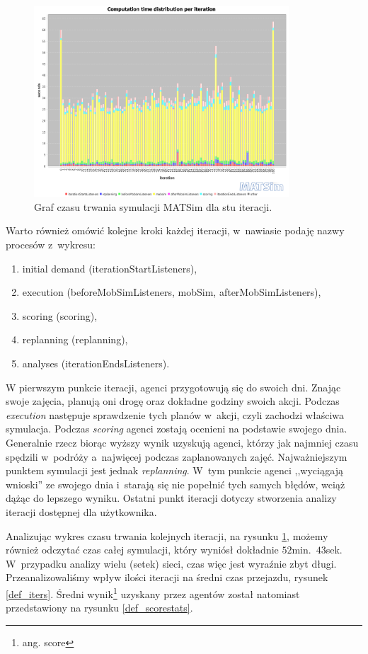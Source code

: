 \documentclass[twoside,12pt]{report}
\begin{document}
\begin{figure}[ht]
\centering
\includegraphics[width=0.85\textwidth]{img/def_stopwatch}
\caption{Graf czasu trwania symulacji MATSim dla stu iteracji.}
\label{def_stopwatch}
\end{figure}

Warto również omówić kolejne kroki każdej iteracji, w~nawiasie podaję nazwy procesów z~wykresu:
\begin{enumerate}
\item initial demand (iterationStartListeners),
\item execution (beforeMobSimListeners, mobSim, afterMobSimListeners), 
\item scoring (scoring),
\item replanning (replanning),
\item analyses (iterationEndsListeners).
\end{enumerate}

W pierwszym punkcie iteracji, agenci przygotowują się do swoich dni. Znając swoje zajęcia, planują oni drogę oraz dokładne godziny swoich akcji. Podczas \textit{execution} następuje sprawdzenie tych planów w~akcji, czyli zachodzi właściwa symulacja. Podczas \textit{scoring} agenci zostają ocenieni na podstawie swojego dnia. Generalnie rzecz biorąc wyższy wynik uzyskują agenci, którzy jak najmniej czasu spędzili w~podróży a~najwięcej podczas zaplanowanych zajęć. Najważniejszym punktem symulacji jest jednak \textit{replanning}. W~tym punkcie agenci ,,wyciągają wnioski'' ze swojego dnia i~starają się nie popełnić tych samych błędów, wciąż dążąc do lepszego wyniku. Ostatni punkt iteracji dotyczy stworzenia analizy iteracji dostępnej dla użytkownika.

Analizując wykres czasu trwania kolejnych iteracji, na rysunku \ref{def_stopwatch}, możemy również odczytać czas całej symulacji, który wyniósł dokładnie $52$min.~$43$sek.  W~przypadku analizy wielu (setek) sieci, czas więc jest wyraźnie zbyt długi. Przeanalizowaliśmy wpływ ilości iteracji na średni czas przejazdu, rysunek \ref{def_iters}. Średni wynik\footnote{ang. score} uzyskany przez agentów został natomiast przedstawiony na rysunku \ref{def_scorestats}.
\end{document}

